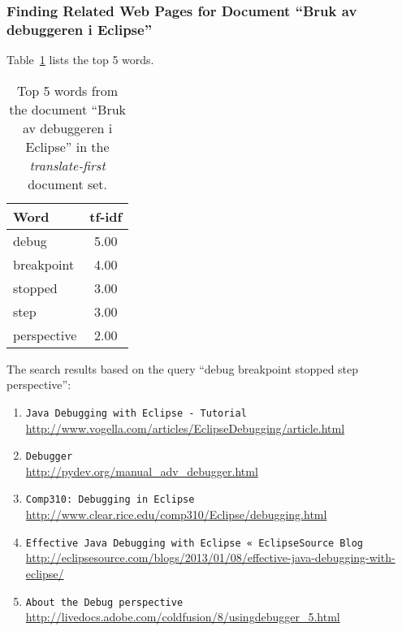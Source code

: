 
\subsubsection{Finding Related Web Pages for Document ``Bruk av debuggeren i Eclipse''}
\label{subsubsec:en-bruk-av-debuggeren-i-eclipse}

Table~\ref{tab:topWords-en-bruk-av-debuggeren-i-eclipse} lists the top 5 words.
\begin{table}[H]
\centering
\begin{tabular}{|l|c|}
\hline\hline
    Word & tf-idf \\
\hline
    debug & 5.00 \\
    breakpoint & 4.00 \\
    stopped & 3.00 \\
    step & 3.00 \\
    perspective & 2.00 \\
\hline\hline
\end{tabular}
\caption{Top 5 words from the document ``Bruk av debuggeren i Eclipse'' in the \textit{translate-first} document set.}
\label{tab:topWords-en-bruk-av-debuggeren-i-eclipse}
\end{table}

The search results based on the query ``debug breakpoint stopped step perspective'':

\begin{enumerate}
\item
    \verb|Java Debugging with Eclipse - Tutorial| \\
    \url{http://www.vogella.com/articles/EclipseDebugging/article.html}
\item
    \verb|Debugger| \\
    \url{http://pydev.org/manual_adv_debugger.html}
\item
    \verb|Comp310: Debugging in Eclipse| \\
    \url{http://www.clear.rice.edu/comp310/Eclipse/debugging.html}
\item
    \verb|Effective Java Debugging with Eclipse « EclipseSource Blog| \\
    \url{http://eclipsesource.com/blogs/2013/01/08/effective-java-debugging-with-eclipse/}
\item
    \verb|About the Debug perspective| \\
    \url{http://livedocs.adobe.com/coldfusion/8/usingdebugger_5.html}
\end{enumerate}

